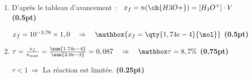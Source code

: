 \begin{enumerate}
          $n_{0}-x_{\max}=0 \quad\Rightarrow\quad
          x_{\max}=n_{0}=\qty{2,0e-3}{\mol}$
          \hfill\textbf{(1pt)}
    \item D'après le tableau d'avancement~: \
          $x_{f}=n(\ch{H3O+})=\left[H_{3} O^{+}\right]\cdot V$
          \hfill\textbf{(0.5pt)}
        
          $x_{f}=10^{-3,76} \times 1,0 \quad\Rightarrow\quad
          \mathbox{x_{f}=\qty{1,74e-4}{\mol}}$
          \hfill\textbf{(0.5pt)}
    \item $\tau=\frac{x_{f}}{x_{\max}}=\frac{\num{1.74e-4}}{\num{2.0e-3}}=0,087
          \quad\Rightarrow\quad
          \mathbox{\tau=8,7\%}$
          \hfill\textbf{(0.75pt)}

          $\tau<1\ \Rightarrow$ La réaction est limitée.
          \hfill\textbf{(0.25pt)}
\end{enumerate}
